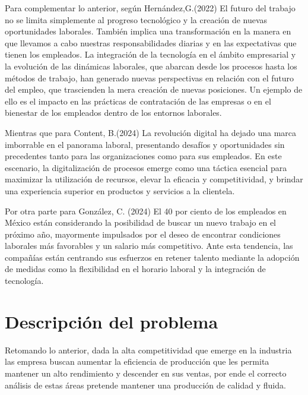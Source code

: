     Para complementar lo anterior, según Hernández,G.(2022) El futuro del trabajo no se limita simplemente al progreso tecnológico y la creación de nuevas oportunidades laborales. También implica una transformación en la manera en que llevamos a cabo nuestras responsabilidades diarias y en las expectativas que tienen los empleados. La integración de la tecnología en el ámbito empresarial y la evolución de las dinámicas laborales, que abarcan desde los procesos hasta los métodos de trabajo, han generado nuevas perspectivas en relación con el futuro del empleo, que trascienden la mera creación de nuevas posiciones. Un ejemplo de ello es el impacto en las prácticas de contratación de las empresas o en el bienestar de los empleados dentro de los entornos laborales.\cite{REF4}
    
    Mientras que para Content, B.(2024) La revolución digital ha dejado una marca imborrable en el panorama laboral, presentando desafíos y oportunidades sin precedentes tanto para las organizaciones como para sus empleados. En este escenario, la digitalización de procesos emerge como una táctica esencial para maximizar la utilización de recursos, elevar la eficacia y competitividad, y brindar una experiencia superior en productos y servicios a la clientela.
    
    Por otra parte para González, C. (2024)
    El 40 por ciento de los empleados en México están considerando la posibilidad de buscar un nuevo trabajo en el próximo año, mayormente impulsados por el deseo de encontrar condiciones laborales más favorables y un salario más competitivo. Ante esta tendencia, las compañías están centrando sus esfuerzos en retener talento mediante la adopción de medidas como la flexibilidad en el horario laboral y la integración de tecnología.\cite{REF5}
    \section{Descripción del problema}
    Retomando lo anterior, dada la alta competitividad que emerge en la industria las empresa buscan aumentar la eficiencia de producción que les permita mantener un alto rendimiento y descender en sus ventas, por ende el correcto análisis de estas áreas pretende mantener una producción de calidad y fluida.
    

